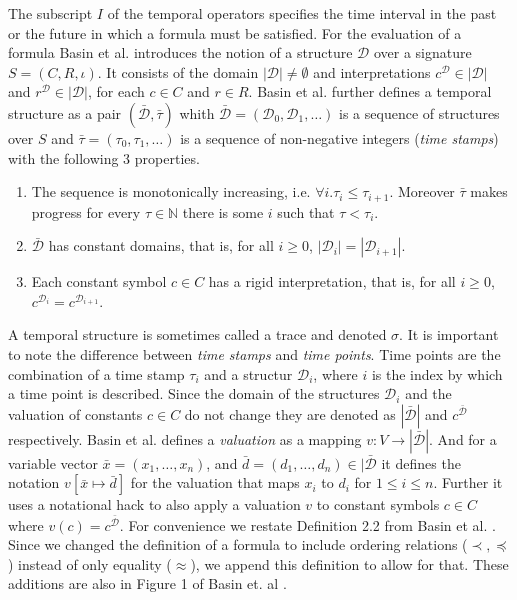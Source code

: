 The subscript $I$ of the temporal operators specifies the time interval in the past or the future in which a formula must be satisfied.
For the evaluation of a formula Basin et al. \cite{Basin2015} introduces the notion of a structure $\mathcal{D}$ over a signature $S=(C,R,\iota)$.
It consists of the domain $| \mathcal{D} | \neq \emptyset$ and interpretations $c^\mathcal{D} \in |\mathcal{D}|$ and $r^\mathcal{D} \in |\mathcal{D}|$, for each $c \in C$ and $r \in R$.
Basin et al. \cite{Basin2015} further defines a temporal structure as a pair $(\bar{\mathcal{D}}, \bar{\tau})$ whith $\bar{\mathcal{D}} = (\mathcal{D}_0, \mathcal{D}_1, \dots)$ is a sequence of structures over $S$ and $\bar{\tau} = (\tau_0, \tau_1, \dots)$ is a sequence of non-negative integers (\textit{time stamps}) with the following 3 properties.
\renewcommand{\labelenumi}{\arabic{enumi}.}
\begin{enumerate}
    \item The sequence is monotonically increasing, i.e. $\forall i . \tau_i \leq \tau_{i+1}$. Moreover $\bar{\tau}$ makes progress for every $\tau \in \mathbb{N}$ there is some $i$ such that $\tau < \tau_i$. 
    \item $\bar{\mathcal{D}}$ has constant domains, that is, for all $i \geq 0$, $|\mathcal{D}_i| = |\mathcal{D}_{i+1}|$.
    \item Each constant symbol $c \in C$ has a rigid interpretation, that is, for all $i \geq 0$, $c^{\mathcal{D}_i} = c^{\mathcal{D}_{i+1}}$.
\end{enumerate}
A temporal structure is sometimes called a trace and denoted $\sigma$.
It is important to note the difference between \textit{time stamps} and \textit{time points}.
Time points are the combination of a time stamp $\tau_i$ and a structur $\mathcal{D}_i$, where $i$ is the index by which a time point is described.
Since the domain of the structures $\mathcal{D}_i$ and the valuation of constants $c \in C$ do not change they are denoted as $|\bar{\mathcal{D}}|$ and $c^{\bar{\mathcal{D}}}$ respectively.
Basin et al. defines a \textit{valuation} as a mapping $v : V \to |\bar{\mathcal{D}}|$.
And for a variable vector $\bar{x} = (x_1,\dots,x_n)$, and $\bar{d}=(d_1,\dots,d_n) \in |\bar{\mathcal{D}}$ it defines the notation $v[\bar{x} \mapsto \bar{d}]$ for the valuation that maps $x_i$ to $d_i$ for $1 \leq i \leq n$.
Further it uses a notational hack to also apply a valuation $v$ to constant symbols $c \in C$ where $v(c) = c^{\bar{\mathcal{D}}}$.
For convenience we restate Definition 2.2 from Basin et al. \cite{Basin2015}.
Since we changed the definition of a formula to include ordering relations ($\prec, \preceq$) instead of only equality ($\approx$), we append this definition to allow for that.
These additions are also in Figure 1 of Basin et. al \cite{Basin2020}.

